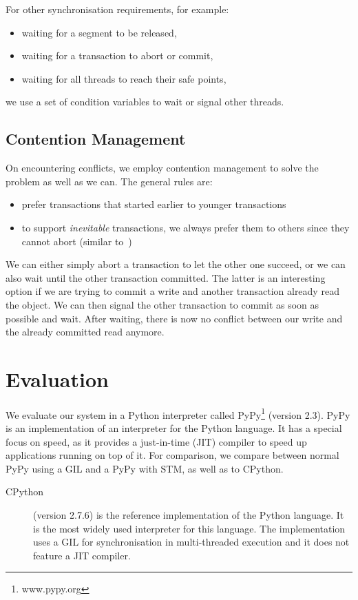 \documentclass{sigplanconf}
\begin{document}
For other synchronisation requirements, for example:
\begin{itemize}[noitemsep]
\item waiting for a segment to be released,
\item waiting for a transaction to abort or commit,
\item waiting for all threads to reach their safe points,
\end{itemize}
we use a set of condition variables to wait or signal other threads.


\subsection{Contention Management\label{subsub:contentionmanagement}}

On encountering conflicts, we employ contention management to solve
the problem as well as we can. The general rules are:
\begin{itemize}[noitemsep]
\item prefer transactions that started earlier to younger transactions
\item to support \emph{inevitable} transactions, we always prefer them
  to others since they cannot abort (similar to~\cite{blundell06})
\end{itemize}
We can either simply abort a transaction to let the other one succeed,
or we can also wait until the other transaction committed. The latter
is an interesting option if we are trying to commit a write and
another transaction already read the object. We can then signal the
other transaction to commit as soon as possible and wait. After
waiting, there is now no conflict between our write and the already
committed read anymore.



\section{Evaluation}

We evaluate our system in a Python interpreter called
PyPy\footnote{www.pypy.org} (version 2.3). PyPy is an implementation of an
interpreter for the Python language. It has a special focus on speed,
as it provides a just-in-time (JIT) compiler to speed up applications
running on top of it. For comparison, we compare between normal PyPy
using a GIL and a PyPy with STM, as well as to CPython.
\begin{description}
\item[CPython] (version 2.7.6) is the reference implementation of the Python
  language. It is the most widely used interpreter for this language.
  The implementation uses a GIL for synchronisation in multi-threaded
  execution and it does not feature a JIT compiler.
\end{description}
\end{document}
